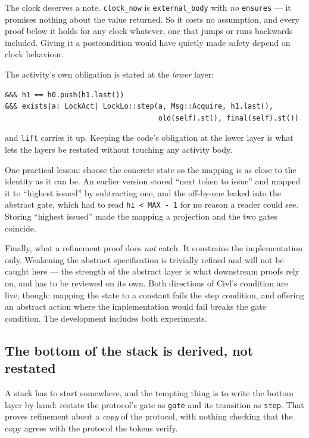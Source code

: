 \documentclass[11pt]{article}
\newcommand{\code}[1]{\texttt{#1}}
\begin{document}
The clock deserves a note. \code{clock\_now} is \code{external\_body} with
\emph{no} \code{ensures} --- it promises nothing about the value returned. So it
costs no assumption, and every proof below it holds for any clock whatever, one
that jumps or runs backwards included. Giving it a postcondition would have
quietly made safety depend on clock behaviour.

The activity's own obligation is stated at the \emph{lower} layer:

\begin{lstlisting}
&&& h1 == h0.push(h1.last())
&&& exists|a: LockAct| LockLo::step(a, Msg::Acquire, h1.last(),
                                    old(self).st(), final(self).st())
\end{lstlisting}

and \code{lift} carries it up. Keeping the code's obligation at the lower layer
is what lets the layers be restated without touching any activity body.

One practical lesson: choose the concrete state so the mapping is as close to
the identity as it can be. An earlier version stored ``next token to issue'' and
mapped it to ``highest issued'' by subtracting one, and the off-by-one leaked
into the abstract gate, which had to read \code{hi < MAX - 1} for no reason a
reader could see. Storing ``highest issued'' made the mapping a projection and
the two gates coincide.

Finally, what a refinement proof does \emph{not} catch. It constrains the
implementation only. Weakening the abstract specification is trivially refined
and will not be caught here --- the strength of the abstract layer is what
downstream proofs rely on, and has to be reviewed on its own. Both directions of
Civl's condition are live, though: mapping the state to a constant fails the
step condition, and offering an abstract action where the implementation would
fail breaks the gate condition. The development includes both experiments.

\subsection*{The bottom of the stack is derived, not restated}

A stack has to start somewhere, and the tempting thing is to write the bottom
layer by hand: restate the protocol's gate as \code{gate} and its transition as
\code{step}. That proves refinement about a \emph{copy} of the protocol, with
nothing checking that the copy agrees with the protocol the tokens verify.
\end{document}
